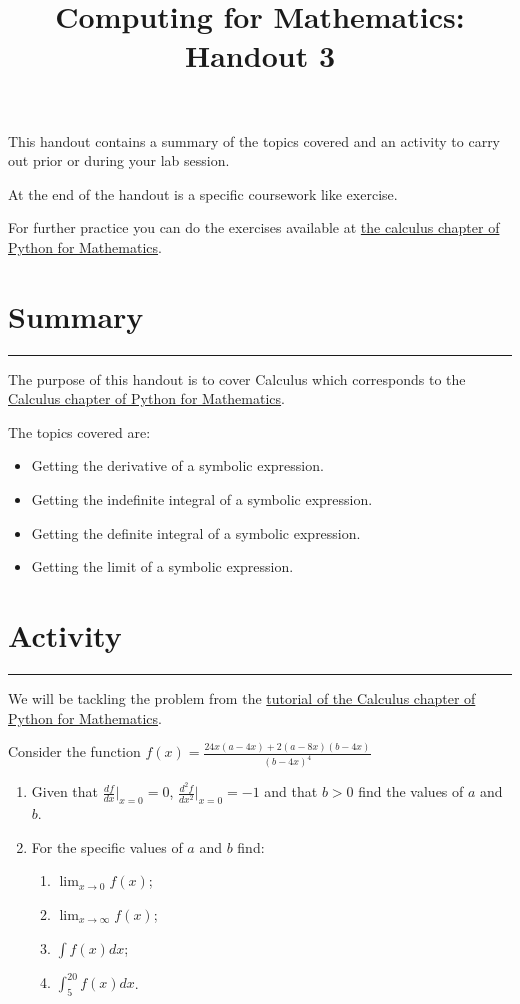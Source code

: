\documentclass{article}
\title{Computing for Mathematics: Handout 3}
\date{}
\begin{document}
\maketitle


This handout contains a summary of the topics covered and an activity to
carry out prior or during your lab session.

At the end of the handout is a specific coursework like exercise.

For further practice you can do the exercises available at 
\href{https://vknight.org/pfm/tools-for-mathematics/03-calculus/exercises/main.html}{the
calculus chapter of Python for Mathematics}.

\section{Summary}\label{summary}
\hrule


The purpose of this handout is to cover Calculus which
corresponds to the
\href{https://vknight.org/pfm/tools-for-mathematics/03-calculus/introduction/main.html}{Calculus
chapter of Python for Mathematics}.

The topics covered are:

\begin{itemize}
\item
  Getting the derivative of a symbolic expression.
\item
  Getting the indefinite integral of a symbolic expression.
\item
  Getting the definite integral of a symbolic expression.
\item
  Getting the limit of a symbolic expression.
\end{itemize}


\section{Activity}\label{activity}
\hrule

We will be tackling the problem from the
\href{https://vknight.org/pfm/tools-for-mathematics/03-calculus/tutorial/main.html}{tutorial
of the Calculus chapter of Python for Mathematics}.

Consider the function $f(x)= \frac{24 x \left(a - 4 x\right) + 2 \left(a - 8 x\right) \left(b - 4 x\right)}{\left(b - 4 x\right)^{4}}$

\begin{enumerate}
    \item Given that $\frac{df}{dx}|_{x=0}=0$, $\frac{d^2f}{dx^2}|_{x=0}=-1$ and
    that $b>0$ find the values of $a$ and $b$.
    \item For the specific values of $a$ and $b$ find:
        \begin{enumerate}
            \item $\lim_{x\to 0}f(x)$;
            \item $\lim_{x\to \infty}f(x)$;
            \item $\int f(x) dx$;
            \item $\int_{5}^{20} f(x) dx$.
        \end{enumerate}
\end{enumerate}
\end{document}

